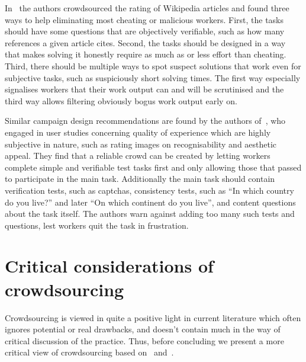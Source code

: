 \documentclass{sig-alternate}
\begin{document}
In~\cite{kittur2008crowdsourcing} the authors crowdsourced the rating of
Wikipedia articles and found three ways to help eliminating most cheating or
malicious workers. First, the tasks should have some questions that are
objectively verifiable, such as how many references a given article cites.
Second, the tasks should be designed in a way that makes solving it honestly
require as much as or less effort than cheating. Third, there should be
multiple ways to spot suspect solutions that work even for subjective tasks,
such as suspiciously short solving times. The first way especially signalises
workers that their work output can and will be scrutinised and the third way
allows filtering obviously bogus work output early on.

Similar campaign design recommendations are found by the authors
of~\cite{hossfeld2013crowdtesting, redi2013crowdsourcing}, who engaged in user
studies concerning quality of experience which are highly subjective in
nature, such as rating images on recognisability and aesthetic appeal. They
find that a reliable crowd can be created by letting workers complete simple
and verifiable test tasks first and only allowing those that passed to
participate in the main task. Additionally the main task should contain
verification tests, such as captchas, consistency tests, such as ``In which
country do you live?'' and later ``On which continent do you live'', and content
questions about the task itself. The authors warn against adding too many such
tests and questions, lest workers quit the task in frustration. 


\section{Critical considerations of crowdsourcing}

Crowdsourcing is viewed in quite a positive light in current literature which
often ignores potential or real drawbacks, and doesn't contain much in the way
of critical discussion of the practice. Thus, before concluding we present a
more critical view of crowdsourcing based on~\cite{simula2013rise}
and~\cite{brabham2008crowdsourcing}.
\end{document}
